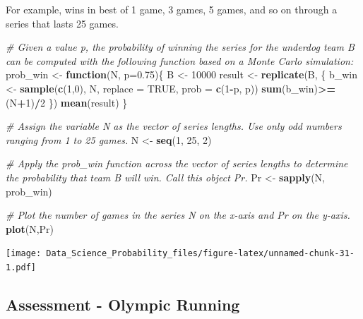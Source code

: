 \documentclass[
]{article}
\newenvironment{Shaded}{\begin{snugshade}}{\end{snugshade}}
\newcommand{\CommentTok}[1]{\textcolor[rgb]{0.56,0.35,0.01}{\textit{#1}}}
\newcommand{\ControlFlowTok}[1]{\textcolor[rgb]{0.13,0.29,0.53}{\textbf{#1}}}
\newcommand{\DataTypeTok}[1]{\textcolor[rgb]{0.13,0.29,0.53}{#1}}
\newcommand{\DecValTok}[1]{\textcolor[rgb]{0.00,0.00,0.81}{#1}}
\newcommand{\FloatTok}[1]{\textcolor[rgb]{0.00,0.00,0.81}{#1}}
\newcommand{\KeywordTok}[1]{\textcolor[rgb]{0.13,0.29,0.53}{\textbf{#1}}}
\newcommand{\NormalTok}[1]{#1}
\newcommand{\OperatorTok}[1]{\textcolor[rgb]{0.81,0.36,0.00}{\textbf{#1}}}
\newcommand{\OtherTok}[1]{\textcolor[rgb]{0.56,0.35,0.01}{#1}}
\newcommand{\StringTok}[1]{\textcolor[rgb]{0.31,0.60,0.02}{#1}}
\begin{document}
For example, wins in best of 1 game, 3 games, 5 games, and so on through
a series that lasts 25 games.

\begin{Shaded}
\begin{Highlighting}[]
\CommentTok{\# Given a value \textquotesingle{}p\textquotesingle{}, the probability of winning the series for the underdog team B can be computed with the following function based on a Monte Carlo simulation:}
\NormalTok{prob\_win \textless{}{-}}\StringTok{ }\ControlFlowTok{function}\NormalTok{(N, }\DataTypeTok{p=}\FloatTok{0.75}\NormalTok{)\{}
\NormalTok{      B \textless{}{-}}\StringTok{ }\DecValTok{10000}
\NormalTok{      result \textless{}{-}}\StringTok{ }\KeywordTok{replicate}\NormalTok{(B, \{}
\NormalTok{        b\_win \textless{}{-}}\StringTok{ }\KeywordTok{sample}\NormalTok{(}\KeywordTok{c}\NormalTok{(}\DecValTok{1}\NormalTok{,}\DecValTok{0}\NormalTok{), N, }\DataTypeTok{replace =} \OtherTok{TRUE}\NormalTok{, }\DataTypeTok{prob =} \KeywordTok{c}\NormalTok{(}\DecValTok{1}\OperatorTok{{-}}\NormalTok{p, p))}
        \KeywordTok{sum}\NormalTok{(b\_win)}\OperatorTok{\textgreater{}=}\NormalTok{(N}\OperatorTok{+}\DecValTok{1}\NormalTok{)}\OperatorTok{/}\DecValTok{2}
\NormalTok{        \})}
      \KeywordTok{mean}\NormalTok{(result)}
\NormalTok{    \}}

\CommentTok{\# Assign the variable \textquotesingle{}N\textquotesingle{} as the vector of series lengths. Use only odd numbers ranging from 1 to 25 games.}
\NormalTok{N \textless{}{-}}\StringTok{ }\KeywordTok{seq}\NormalTok{(}\DecValTok{1}\NormalTok{, }\DecValTok{25}\NormalTok{, }\DecValTok{2}\NormalTok{)}

\CommentTok{\# Apply the \textquotesingle{}prob\_win\textquotesingle{} function across the vector of series lengths to determine the probability that team B will win. Call this object \textasciigrave{}Pr\textasciigrave{}.}
\NormalTok{Pr \textless{}{-}}\StringTok{ }\KeywordTok{sapply}\NormalTok{(N, prob\_win)}

\CommentTok{\# Plot the number of games in the series \textquotesingle{}N\textquotesingle{} on the x{-}axis and \textquotesingle{}Pr\textquotesingle{} on the y{-}axis.}
\KeywordTok{plot}\NormalTok{(N,Pr)}
\end{Highlighting}
\end{Shaded}

\texttt{[image: Data\_Science\_Probability\_files/figure-latex/unnamed-chunk-31-1.pdf]}

\hypertarget{assessment---olympic-running}{%
\subsection{Assessment - Olympic
Running}\label{assessment---olympic-running}}
\end{document}
